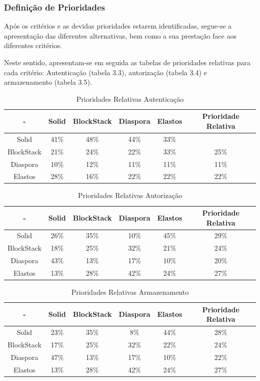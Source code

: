 \pagebreak

\subsubsection{Definição de Prioridades}
Após os critérios e as devidas prioridades estarem identificadas, segue-se a apresentação das diferentes alternativas, bem como a sua prestação face aos diferentes critérios.

Neste sentido, apresentam-se em seguida as tabelas de prioridades relativas para cada critério: Autenticação (tabela 3.3), autorização (tabela 3.4) e armazenamento (tabela 3.5). 

\begin{table}[h]
\centering
\caption{Prioridades Relativas Autenticação}
\vspace{0.5cm}
\begin{tabular}{c|c|c|c|c|c} 
 - & Solid & BlockStack & Diaspora & Elastos & Prioridade Relativa \\
\hline                               
Solid & 41\% &	48\% &	44\% & 33\% \\
BlockStack &  21\% & 24\% &	22\% &	33\% &	25\% \\
Diaspora &  10\% &	12\% &	11\% & 11\%	& 11\% \\
Elastos & 28\% & 16\% & 22\% & 22\% & 22\% \\
\end{tabular}
\end{table}

\begin{table}[h]
\centering
\caption{Prioridades Relativas Autorização}
\vspace{0.5cm}
\begin{tabular}{c|c|c|c|c|c} 
 - & Solid & BlockStack & Diaspora & Elastos & Prioridade Relativa \\
\hline                               
Solid & 26\% &	35\% &	10\% & 45\% & 29\% \\
BlockStack &  18\% & 25\% & 32\% & 21\% & 24\% \\
Diaspora &  43\% &	13\% &	17\% &	10\% & 20\% \\
Elastos & 13\% & 28\% &	42\% & 24\% & 27\% \\
\end{tabular}
\end{table}

\begin{table}[h]
\centering
\caption{Prioridades Relativas Armazenamento}
\vspace{0.5cm}
\begin{tabular}{c|c|c|c|c|c} 
 - & Solid & BlockStack & Diaspora & Elastos & Prioridade Relativa \\
\hline                               
Solid & 23\% & 35\% & 8\% & 44\% & 28\% \\
BlockStack &  17\% & 25\%	& 32\%	& 22\%	& 24\% \\
Diaspora &  47\% &	13\% & 17\%	& 10\% & 22\% \\
Elastos & 13\% & 28\% & 42\% & 24\% & 27\% \\
\end{tabular}
\end{table}

